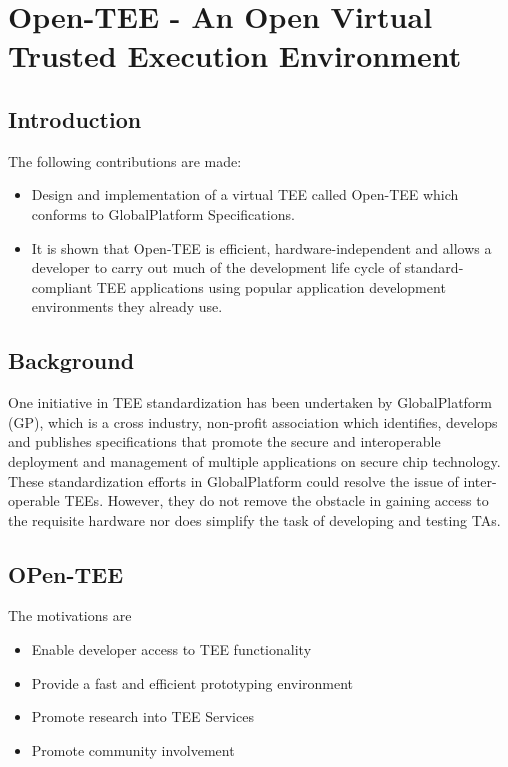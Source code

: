 \documentclass{article}
\begin{document}
\section{Open-TEE - An Open Virtual Trusted Execution Environment}

\subsection{Introduction}

The following contributions are made: \begin{itemize} 
\item Design and implementation of a virtual TEE called Open-TEE which conforms to GlobalPlatform Specifications.
\item It is shown that Open-TEE is efficient, hardware-independent and allows a developer to carry out much of the development life cycle of standard-compliant TEE applications using popular application development environments they already use.
\end{itemize}

\subsection{Background}

One initiative in TEE standardization has been undertaken by GlobalPlatform (GP), which is a cross industry, non-profit association which identifies, develops and publishes specifications that promote the secure and interoperable deployment and management of multiple applications on secure chip technology. These standardization efforts in GlobalPlatform could resolve the issue of inter-operable TEEs. However, they do not remove the obstacle in gaining access to the requisite hardware nor does simplify the task of developing and testing TAs.

\subsection{OPen-TEE}

The motivations are \begin{itemize}
\item Enable developer access to TEE functionality
\item Provide a fast and efficient prototyping environment
\item Promote research into TEE Services
\item Promote community involvement
\end{itemize}
\end{document}
